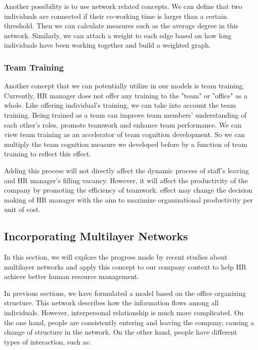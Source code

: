 \documentclass[tcn = 37075, sheet = false, abstract = false]{mcmthesis}
\begin{document}
Another possibility is to use network related concepts. We can define that two individuals are connected if their co-working time is larger than a certain threshold. Then we can calculate measures such as the average degree in this network. Similarly, we can attach a weight to each edge based on how long individuals have been working together and build a weighted graph.
 
\subsubsection{Team Training}

Another concept that we can potentially utilize in our models is team training. Currently, HR manager does not offer any training to the "team" or "office" as a whole. Like offering individual's training, we can take into account the team training. Being trained as a team can improve team members' understanding of each other's roles, promote teamwork and enhance team performance\cite{cooke2004advances}. We can view team training as an accelerator of team cognition development. So we can multiply the team cognition measure we developed before by a function of team training to reflect this effect. 

Adding this process will not directly affect the dynamic process of staff's leaving and HR manager's filling vacancy. However, it will affect the productivity of the company by promoting the efficiency of teamwork.  effect may change the decision making of HR manager with the aim to maximize organizational productivity per unit of cost. 

\subsection{Incorporating Multilayer Networks\cite{kivela2014multilayer} }

In this section, we will explore the progress made by recent studies about multilayer networks and apply this concept to our company context to help HR achieve better human resource management.

In previous sections, we have formulated a model based on the office organizing structure. This network describes how the information flows among all individuals. However,  interpersonal relationship is much more complicated. On the one hand, people are consistently entering and leaving the company, causing a change of structure in the network. On the other hand, people have different types of interaction, such as:
\end{document}
